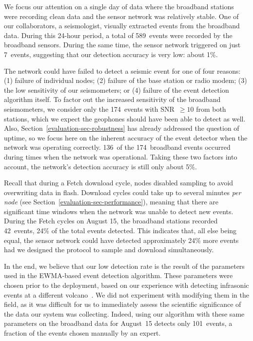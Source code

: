 We focus our attention on a single day of data where the broadband stations
were recording clean data and the sensor network was relatively stable. One
of our collaborators, a seismologist, visually extracted events from the
broadband data. During this 24-hour period, a total of 589~events were
recorded by the broadband sensors. During the same time, the sensor network
triggered on just 7~events, suggesting that our detection accuracy is very
low: about 1\%.

The network could have failed to detect a seismic event for one of four
reasons: (1) failure of individual nodes; (2) failure of the base station or
radio modem; (3) the low sensitivity of our seismometers; or (4) failure of
the event detection algorithm itself. To factor out the increased sensitivity
of the broadband seismometers, we consider only the 174~events with SNR~$\geq
10$ from both stations, which we expect the geophones should have been able
to detect as well. Also, Section~\ref{evaluation-sec-robustness} has already
addressed the question of uptime, so we focus here on the inherent accuracy
of the event detector when the network was operating correctly. 136~of the
174~broadband events occurred during times when the network was operational.
Taking these two factors into account, the network's detection accuracy is
still only about 5\%.

Recall that during a Fetch download cycle, nodes disabled sampling to avoid
overwriting data in flash. Download cycles could take up to several minutes
\textit{per node} (see Section~\ref{evaluation-sec-performance}), meaning
that there are significant time windows when the network was unable to detect
new events. During the Fetch cycles on August 15, the broadband stations
recorded 42~events, 24\% of the total events detected. This indicates that,
all else being equal, the sensor network could have detected approximately
24\% more events had we designed the protocol to sample and download
simultaneously.

In the end, we believe that our low detection rate is the result of the
parameters used in the EWMA-based event detection algorithm. These parameters
were chosen prior to the deployment, based on our experience with detecting
infrasonic events at a different volcano~\cite{volcano-ewsn05}. We did not
experiment with modifying them in the field, as it was difficult for us to
immediately assess the scientific significance of the data our system was
collecting. Indeed, using our algorithm with these same parameters on the
broadband data for August~15 detects only 101~events, a fraction of the
events chosen manually by an expert.

